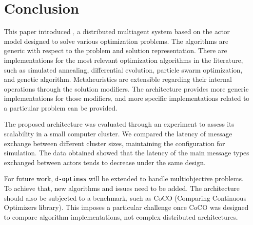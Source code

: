 \documentclass[preprint,12pt]{elsarticle}
\begin{document}
\section{Conclusion}
\label{sec:conclusion}

This paper introduced , a distributed multiagent system based on the actor model designed to solve various optimization problems. The algorithms are generic with respect to the problem and solution representation. There are implementations for the most relevant optimization algorithms in the literature, such as simulated annealing, differential evolution, particle swarm optimization, and genetic algorithm. Metaheuristics are extensible regarding their internal operations through the solution modifiers. The architecture provides more generic implementations for those modifiers, and more specific implementations related to a particular problem can be provided.

The proposed architecture was evaluated through an experiment to assess its scalability in a small computer cluster. We compared the latency of message exchange between different cluster sizes, maintaining the configuration for simulation. The data obtained showed that the latency of the main message types exchanged between actors tends to decrease under the same design. 

For future work, \texttt{d-optimas} will be extended to handle multiobjective problems. To achieve that, new algorithms and issues need to be added. The architecture should also be subjected to a benchmark, such as CoCO (Comparing Continuous Optimizers library)\cite{hansen2021}. This imposes a particular challenge once CoCO was designed to compare algorithm implementations, not complex distributed architectures.

  
 
\end{document}
